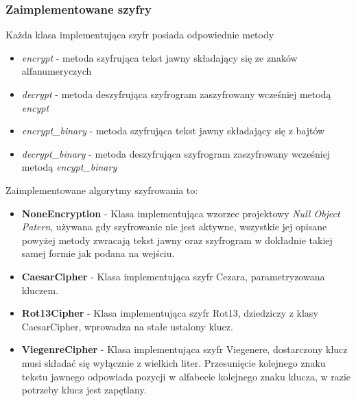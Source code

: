 \documentclass{article}
\begin{document}
    \subsubsection{Zaimplementowane szyfry}
      Każda klasa implementująca szyfr posiada odpowiednie metody
      \begin{itemize}
          \item \emph{encrypt} - metoda szyfrująca tekst jawny składający się ze znaków alfanumeryczych
          \item \emph{decrypt} - metoda deszyfrująca szyfrogram zaszyfrowany wcześniej metodą \emph{encypt}
          \item \emph{encrypt\_binary} - metoda szyfrująca tekst jawny składający się z bajtów
          \item \emph{decrypt\_binary} - metoda deszyfrująca szyfrogram zaszyfrowany wcześniej metodą \emph{encypt\_binary}
      \end{itemize}

      Zaimplementowane algorytmy szyfrowania to:
      \begin{itemize}
          \item {\bfseries NoneEncryption} - Klasa implementująca wzorzec projektowy \emph{Null Object Patern}, używana
              gdy szyfrowanie nie jest aktywne, wszystkie jej opisane powyżej metody zwracają tekst jawny oraz szyfrogram
              w dokładnie takiej samej formie jak podana na wejściu.
          \item {\bfseries CaesarCipher} - Klasa implementująca szyfr Cezara, parametryzowana kluczem.
          \item {\bfseries Rot13Cipher} - Klasa implementująca szyfr Rot13, dziedziczy z klasy CaesarCipher, wprowadza
              na stałe ustalony klucz.
          \item {\bfseries ViegenreCipher} - Klasa implementująca szyfr Viegenere, dostarczony klucz musi składać się
              wyłącznie z wielkich liter. Przesunięcie kolejnego znaku tekstu jawnego odpowiada pozycji w alfabecie kolejnego
              znaku klucza, w razie potrzeby klucz jest zapętlany.
      \end{itemize}
\end{document}
